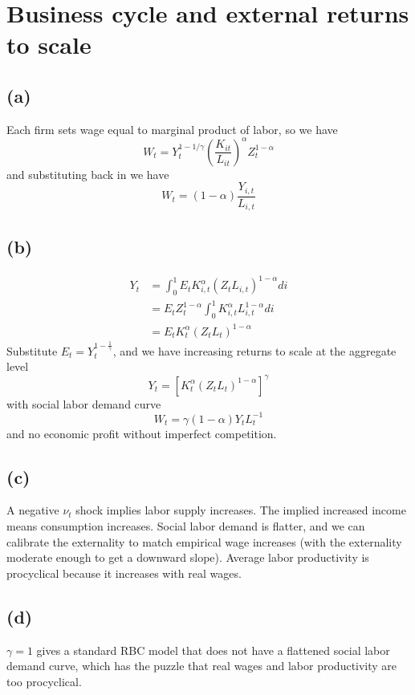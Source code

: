 \documentclass[11pt]{amsart}
\begin{document}
\section{Business cycle and external returns to scale}

\subsection*{(a)}

Each firm sets wage equal to marginal product of labor, so we have
\[
W_t = Y_t^{1-1/\gamma} \left(\frac{K_{it}}{L_{it}}\right)^{\alpha} Z_t^{1-\alpha}
\]
and substituting back in we have
\[
W _ { t } = ( 1- \alpha ) \frac{Y_{i,t}}{L_{i,t}}
\]
\subsection*{(b)}

\begin{align*}
	Y_t &= \int_{0}^{1} E_t K_{i,t}^\alpha \left( Z_t L_{i,t} \right)^{1-\alpha} di \\
	& = E_t Z_t^{1-\alpha} \int_{0}^{1} K_{i,t}^\alpha  L_{i,t}^{1-\alpha} di \\
	& = E_t K_t^\alpha (Z_t L_t)^{1-\alpha}
	\end{align*}
	Substitute $E_t = Y_t^{1- \frac{1}{\gamma}}$, and we have increasing returns to scale at the aggregate level
	\begin{equation*}
	Y _ { t } = \left[ K _ { t } ^ { \alpha } \left( Z _ { t } L _ { t } \right) ^ { 1- \alpha } \right] ^ { \gamma }
	\end{equation*}
	with social labor demand curve
	\[
	W _ { t } = \gamma ( 1- \alpha ) Y _ { t } L _ { t } ^ { - 1}
	\] and no economic profit without imperfect competition. 

\subsection*{(c)}
A negative $\nu_t$ shock implies labor supply increases. 
The implied increased income means consumption increases. 
Social labor demand is flatter, and we can calibrate the externality to match empirical wage increases (with the externality moderate enough to get a downward slope).
Average labor productivity is procyclical because it increases with real wages. 

\subsection*{(d)}
 $\gamma = 1$ gives a standard RBC model that does not have a flattened social labor demand curve, which has the puzzle that real wages and labor productivity are too procyclical. 
 
\end{document}
